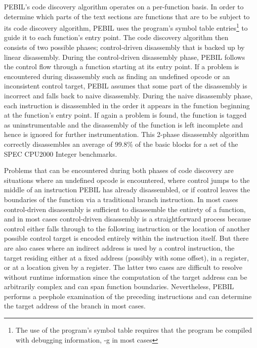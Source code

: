PEBIL's code discovery algorithm operates on a per-function basis.
In order to determine which parts of the text sections are functions that are to be subject to its code discovery algorithm, 
PEBIL uses the program's symbol table entries\footnote{The use of the program's symbol table requires that the program be compiled
with debugging information, -g in most cases} to guide it to each function's entry point. The code discovery algorithm then
consists of two possible phases; control-driven disassembly that is backed up by linear disassembly. During the control-driven disassembly phase, 
PEBIL follows the control flow through a function starting at its entry point. If a problem is encountered during disassembly such as 
finding an undefined opcode or an inconsistent control target, 
PEBIL assumes that some part of the disassembly is incorrect and falls back to naive 
disassembly. During the naive disassembly phase, each instruction is disassembled in the order it appears in the
function beginning at the function's entry point. If again a problem 
is found, the function is tagged as uninstrumentable and the disassembly of the function is left incomplete and
hence is ignored for further instrumentation. This 2-phase disassembly algorithm correctly disassembles
an average of 99.8\% of the basic blocks for a set of the SPEC CPU2000 Integer benchmarks.

Problems that can be encountered during both phases of code discovery
are situations where an undefined opcode is encountered, where control jumps to the
middle of an instruction PEBIL has already disassembled, or if control leaves the boundaries of the function via a traditional branch
instruction. In most
cases control-driven disassembly is sufficient to disassemble the entirety of a function, and in most cases control-driven
disassembly is a straightforward process because control either falls through to the following instruction 
or the location of another possible control target is encoded entirely within the instruction itself. But there are also cases
where an indirect address is used by a control instruction, the target residing either at a fixed address (possibly with some offset), in a register, 
or at a location given by a register. The latter two cases are difficult to resolve
without runtime information since the computation of the target address can be arbitrarily complex and can span function
boundaries. Nevertheless, PEBIL performs a peephole examination of the preceding instructions and can determine 
the target address of the branch in most cases.

